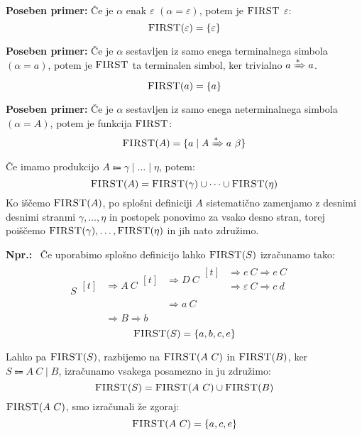 \documentclass{article}
\newcommand{\Ex}{\textbf{Npr.:}\ }
\newcommand{\Special}[1]{\textbf{#1}}
\newcommand{\FIRST}{\textsc{FIRST}}
\newcommand{\Null}{\varepsilon}
\newcommand{\Arrow}{\Coloneqq}
\newcommand{\Derive}{\Rightarrow}
\newcommand{\DeriveStar}{\xRightarrow{\ast}}
\newcommand{\Seq}{\ }
\newcommand{\Union}{\mathrel{|}}
\begin{document}
\Special{Poseben primer:} Če je $\alpha$ enak $\Null$ ${(\alpha = \Null)}$, potem je $\FIRST$ $\Null$:
\begin{equation*}
  \FIRST(\Null) = \{ \Null \}
\end{equation*}

\Special{Poseben primer:} Če je $\alpha$ sestavljen iz samo enega terminalnega simbola ${(\alpha = a)}$, potem je $\FIRST$ ta terminalen simbol, ker trivialno $a \DeriveStar a$.
\begin{equation*}
  \FIRST(a) = \{ a \}
\end{equation*}

\Special{Poseben primer:} Če je $\alpha$ sestavljen iz samo enega neterminalnega simbola ${(\alpha = A)}$, potem je funkcija $\FIRST$:
\begin{equation*}
  \FIRST(A) = \{ a \mid A \DeriveStar a \Seq \beta \}
\end{equation*}
Če imamo produkcijo $A \Arrow \gamma \Union \dots \Union \eta$, potem:
\begin{equation*}
  \FIRST(A) = \FIRST(\gamma) \cup \dots \cup \FIRST(\eta)
\end{equation*}
Ko iščemo $\FIRST(A)$, po splošni definiciji $A$ sistematično zamenjamo z desnimi desnimi stranmi $\gamma, \dots, \eta$ in postopek ponovimo za vsako desno stran, torej poiščemo $\FIRST(\gamma), \dots, \FIRST(\eta)$ in jih nato združimo.

\Ex
Če uporabimo splošno definicijo lahko $\FIRST(S)$ izračunamo tako:
\begin{equation*}
  S \begin{aligned}[t]
    &\Derive A \Seq C \begin{aligned}[t]
      &\Derive D \Seq C \begin{aligned}[t]
        &\Derive e \Seq C \Derive e \Seq C \\
        &\Derive \Null \Seq C \Derive c \Seq d \\
      \end{aligned}\\
      &\Derive a \Seq C
    \end{aligned}\\
  &\Derive B \Derive b
  \end{aligned}
\end{equation*}
\begin{equation*}
  \FIRST(S) = \{a, b, c, e\}
\end{equation*}

Lahko pa $\FIRST(S)$, razbijemo na $\FIRST(A \Seq C)$ in $\FIRST(B)$, ker $S \Arrow A \Seq C \Union B$, izračunamo vsakega posamezno in ju združimo:
\begin{equation*}
  \FIRST(S) = \FIRST(A \Seq C) \cup \FIRST(B)
\end{equation*}
$\FIRST(A \Seq C)$, smo izračunali že zgoraj:
\begin{equation*}
  \FIRST(A \Seq C) = \{a, c, e\}
\end{equation*}
\end{document}
